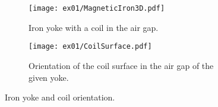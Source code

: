 \begin{figure}[htb]
    \centering
    \begin{subfigure}[b]{0.4\textwidth}
        \centering
        \texttt{[image: ex01/MagneticIron3D.pdf]}
        \caption{Iron yoke with a coil in the air gap.}
        \label{fig:MagneticIron3D}
    \end{subfigure}
    \quad
    \begin{subfigure}[b]{0.4\textwidth}
        \centering
        \texttt{[image: ex01/CoilSurface.pdf]}
        \caption{Orientation of the coil surface in the air gap of the given yoke.}
        \label{fig:CoilSurface}
    \end{subfigure}
    \caption{Iron yoke and coil orientation.}
\end{figure}






